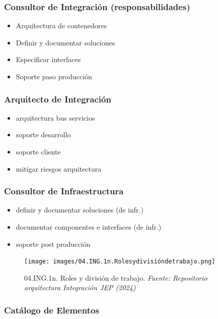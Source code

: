\documentclass[
  paper=a4,
  ,captions=tableheading
]{scrartcl}
\providecommand{\tightlist}{%
  \setlength{\itemsep}{0pt}\setlength{\parskip}{0pt}}
\begin{document}
\subsubsection{Consultor de Integración
(responsabilidades)}\label{sec:consultor-de-integraciuxf3n-responsabilidades}

\begin{itemize}
\tightlist
\item
  Arquitectura de contenedores
\item
  Definir y documentar soluciones
\item
  Especificar interfaces
\item
  Soporte paso producción
\end{itemize}

\subsubsection{Arquitecto de
Integración}\label{sec:arquitecto-de-integraciuxf3n}

\begin{itemize}
\tightlist
\item
  arquitectura bus servicios
\item
  soporte desarrollo
\item
  soporte cliente
\item
  mitigar riesgos arquitectura
\end{itemize}

\subsubsection{Consultor de
Infraestructura}\label{sec:consultor-de-infraestructura}

\begin{itemize}
\tightlist
\item
  definir y documentar soluciones (de infr.)
\item
  documentar componentes e interfaces (de infr.)
\item
  soporte post producción
\end{itemize}

\begin{figure}
\centering
\texttt{[image: images/04.ING.1n.Rolesydivisióndetrabajo.png]}
\caption{04.ING.1n. Roles y división de trabajo. \emph{Fuente:
Repositorio arquitectura Integración JEP
(2024)}}\label{fig:id-3bef3ca04f6d4d1ba6b837b822a51801}
\end{figure}

\subsubsection{Catálogo de
Elementos}\label{sec:catuxe1logo-de-elementos}
\end{document}

